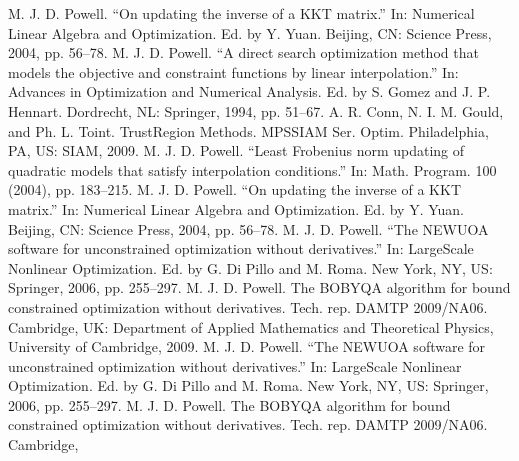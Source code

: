 \documentclass[letterpaper,10pt,english]{sphinxmanual}
\begin{document}
\begin{sphinxthebibliography}{1}
\sphinxAtStartPar
M. J. D. Powell. “On updating the inverse of a KKT matrix.” In:
Numerical Linear Algebra and Optimization. Ed. by Y. Yuan. Beijing,
CN: Science Press, 2004, pp. 56–78.
\sphinxAtStartPar
M. J. D. Powell. “A direct search optimization method that models
the objective and constraint functions by linear interpolation.” In:
Advances in Optimization and Numerical Analysis. Ed. by S. Gomez and
J. P. Hennart. Dordrecht, NL: Springer, 1994, pp. 51–67.
\sphinxAtStartPar
A. R. Conn, N. I. M. Gould, and Ph. L. Toint. Trust\sphinxhyphen{}Region
Methods. MPS\sphinxhyphen{}SIAM Ser. Optim. Philadelphia, PA, US: SIAM, 2009.
\sphinxAtStartPar
M. J. D. Powell. “Least Frobenius norm updating of quadratic models
that satisfy interpolation conditions.” In: Math. Program. 100 (2004),
pp. 183–215.
\sphinxAtStartPar
M. J. D. Powell. “On updating the inverse of a KKT matrix.” In:
Numerical Linear Algebra and Optimization. Ed. by Y. Yuan. Beijing,
CN: Science Press, 2004, pp. 56–78.
\sphinxAtStartPar
M. J. D. Powell. “The NEWUOA software for unconstrained optimization
without derivatives.” In: Large\sphinxhyphen{}Scale Nonlinear Optimization. Ed. by G.
Di Pillo and M. Roma. New York, NY, US: Springer, 2006, pp. 255–297.
\sphinxAtStartPar
M. J. D. Powell. The BOBYQA algorithm for bound constrained
optimization without derivatives. Tech. rep. DAMTP 2009/NA06. Cambridge,
UK: Department of Applied Mathematics and Theoretical Physics, University
of Cambridge, 2009.
\sphinxAtStartPar
M. J. D. Powell. “The NEWUOA software for unconstrained optimization
without derivatives.” In: Large\sphinxhyphen{}Scale Nonlinear Optimization. Ed. by G.
Di Pillo and M. Roma. New York, NY, US: Springer, 2006, pp. 255\sphinxhyphen{}–297.
\sphinxAtStartPar
M. J. D. Powell. The BOBYQA algorithm for bound constrained
optimization without derivatives. Tech. rep. DAMTP 2009/NA06. Cambridge,

\end{sphinxthebibliography}
\end{document}
